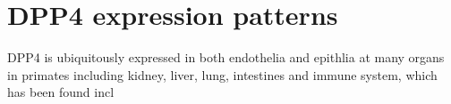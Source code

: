 \section{DPP4 expression patterns}
DPP4 is ubiquitously expressed in both endothelia and epithlia at many organs in primates including kidney, liver, lung, intestines and immune system, which has been found incl